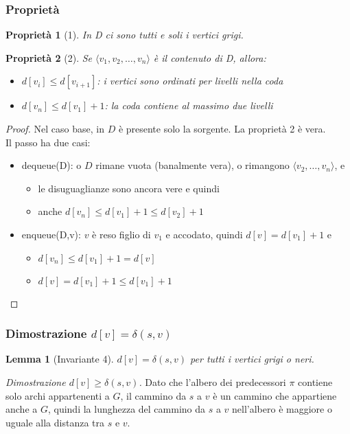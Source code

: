 \documentclass[11pt]{book}
\newtheorem*{proprietà}{Proprietà}
\newtheorem*{lemma}{Lemma}
\begin{document}
\subsubsection{Proprietà}
\begin{proprietà}[1]
    In D ci sono tutti e soli i vertici grigi.
\end{proprietà}
\begin{proprietà}[2]
    Se $\langle v_1,v_2,\dots ,v_n \rangle$ è il contenuto di D, allora:
    \begin{itemize}
        \item[i] $d[v_i] \leq d[v_{i+1}]$: i vertici sono ordinati per livelli nella coda
        \item[ii] $d[v_n] \leq d[v_1]+1$: la coda contiene al massimo due livelli
    \end{itemize}
\end{proprietà}
\begin{proof}
    Nel caso base, in $D$ è presente solo la sorgente. La proprietà 2 è vera.\\
    Il passo ha due casi:
    \begin{itemize}
        \item dequeue(D): o $D$ rimane vuota (banalmente vera), o rimangono $\langle v_2,\dots ,v_n \rangle$, e 
        \begin{itemize}
            \item[i.] le disuguaglianze sono ancora vere e quindi
            \item[ii.] anche $d[v_n] \leq d[v_1]+1 \leq d[v_2]+1$
        \end{itemize}
        \item enqueue(D,v): $v$ è reso figlio di $v_1$ e accodato, quindi $d[v]=d[v_1]+1$ e
        \begin{itemize}
            \item[i.] $d[v_n] \leq d[v_1]+1=d[v]$
            \item[ii.] $d[v]=d[v_1]+1 \leq d[v_1]+1$
        \end{itemize}
    \end{itemize}
\end{proof}
\subsubsection{Dimostrazione $d[v]=\delta(s,v)$}
\begin{lemma}[Invariante 4]
    $d[v]=\delta(s,v)$ per tutti i vertici grigi o neri.
\end{lemma}
\textit{\textit{Dimostrazione $d[v] \geq \delta(s,v)$.}} Dato che l'albero dei predecessori $\pi$ contiene solo archi appartenenti 
a $G$, il cammino da $s$ a $v$ è un cammino che appartiene anche a $G$, quindi la lunghezza del cammino da $s$ a $v$ 
nell'albero è maggiore o uguale alla distanza tra $s$ e $v$.
\end{document}
